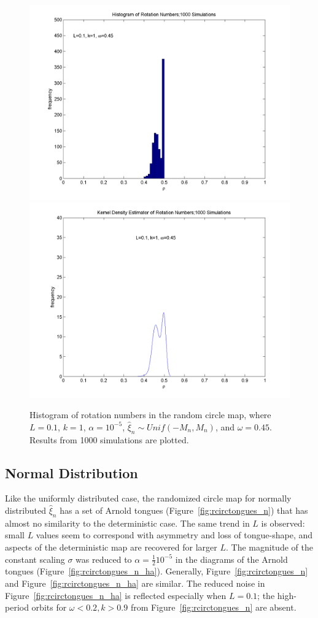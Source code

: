 \begin{figure}[H]\linespread{1}
\caption[Histogram and kernel density estimator of rotation numbers in the random circle
map, $\alpha = 10^{-5}$]{Histogram of rotation numbers in the random circle map, where
  $L=0.1$, $k=1$, $\alpha = 10^{-5}$, $\hat{\xi}_n\sim
  Unif(-M_n,M_n)$, and $\omega = 0.45$. Results from 1000 simulations
  are plotted.}\label{fig:kde1_u}
\centering
\includegraphics[width=.5\textwidth]{figs/hist_rho_k1_L01_om045.png}\hfill
\includegraphics[width=.5\textwidth]{figs/kde_rho_k1_L01_om045.png}
\end{figure}

\subsection{Normal Distribution}
Like the uniformly distributed case, the randomized circle map for normally distributed $\hat{\xi}_n$ has a set of Arnold tongues (Figure~\ref{fig:rcirctongues_n}) that has almost no similarity to the deterministic
case. The same trend in $L$ is observed: small $L$ values seem to correspond
with asymmetry and loss of tongue-shape, and aspects of the
deterministic map are recovered for larger $L$. The magnitude of the constant scaling $\sigma$ was reduced to $\alpha = \frac{1}{2}10^{-5}$ in the diagrams of the Arnold
tongues (Figure~\ref{fig:rcirctongues_n_ha}). Generally,
Figure~\ref{fig:rcirctongues_n} and Figure~\ref{fig:rcirctongues_n_ha}
are similar. The reduced noise in Figure~\ref{fig:rcirctongues_n_ha}
is reflected especially when $L=0.1$; the high-period orbits for
$\omega < 0.2, k > 0.9$ from Figure~\ref{fig:rcirctongues_n} are absent.

